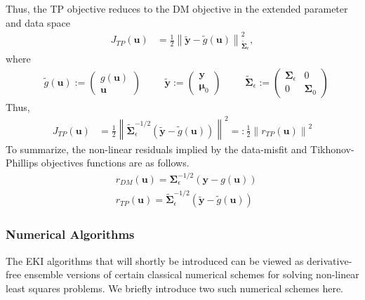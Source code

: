 \documentclass[12pt]{article}
\newcommand{\bpar}{\mathbf{u}} %
\newcommand{\fwd}{g} %
\newcommand{\dataVec}{\mathbf{y}} %
\newcommand{\CovObs}{\boldsymbol{\Sigma}_{\epsilon}} %
\newcommand{\CovPrior}{\boldsymbol{\Sigma}_0} %
\newcommand{\meanPrior}{\mathbf{\mu}_0} %
\newcommand{\CovObsEx}{\tilde{\boldsymbol{\Sigma}}_{\epsilon}} %
\newcommand{\dataVecEx}{\tilde{\dataVec}} %
\newcommand{\fwdEx}{\tilde{\fwd}} %
\newcommand*{\norm}[1]{\left\lVert#1\right\rVert}
\begin{document}
Thus, the TP objective reduces to the DM objective in the extended parameter and data space
\begin{align*}
J_{TP}(\bpar) &= \frac{1}{2} \norm{\dataVecEx - \fwdEx(\bpar)}^2_{\CovObsEx},
\end{align*}
where 
\begin{align}
&\fwdEx(\bpar) := \begin{pmatrix} g(\bpar) \\ \bpar \end{pmatrix} && &\dataVecEx := \begin{pmatrix} \dataVec \\ \meanPrior \end{pmatrix} &&&\CovObsEx := \begin{pmatrix} \CovObs & 0 \\ 0 & \CovPrior \end{pmatrix} \label{extended_space}
\end{align}
Thus, 
\begin{align*}
J_{TP}(\bpar) &= \frac{1}{2} \norm{\CovObsEx^{-1/2} (\dataVecEx - \fwdEx(\bpar))}^2 =: \frac{1}{2} \norm{r_{TP}(\bpar)}^2
\end{align*}
To summarize, the non-linear residuals implied by the data-misfit and Tikhonov-Phillips objectives functions are as follows.
\begin{align}
&r_{DM}(\bpar) = \CovObs^{-1/2}(\dataVec - \fwd(\bpar)) \label{residual_DM} \\
&r_{TP}(\bpar) = \CovObsEx^{-1/2} (\dataVecEx - \fwdEx(\bpar))  \label{residual_TP} 
\end{align}


\subsubsection{Numerical Algorithms}
The EKI algorithms that will shortly be introduced can be viewed as derivative-free ensemble versions of certain classical numerical schemes for solving non-linear least squares problems. We briefly 
introduce two such numerical schemes here.  
\end{document}
